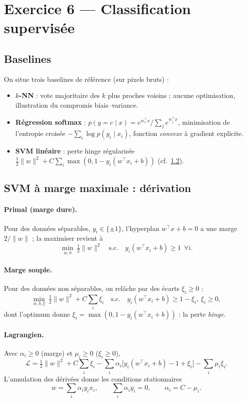 \documentclass[11pt]{article}
\theoremstyle{remark}
\newcommand{\norm}[1]{\lVert #1 \rVert}
\newcommand{\T}{^{\top}}
\begin{document}
\section{Exercice 6 — Classification supervisée}

\subsection{Baselines}
On situe trois baselines de référence (sur pixels bruts) :
\begin{itemize}\itemsep2pt
	\item \textbf{$k$-NN} : vote majoritaire des $k$ plus proches voisins ; aucune
	optimisation, illustration du compromis biais–variance.
	\item \textbf{Régression softmax} : $p(y=c\mid x)=e^{w_c\T x}/\sum_j e^{w_j\T x}$,
	minimisation de l'entropie croisée $-\sum_i\log p(y_i\mid x_i)$, fonction
	\emph{convexe} à gradient explicite.
	\item \textbf{SVM linéaire} : perte hinge régularisée
	$\tfrac12\norm{w}^2+C\sum_i\max(0,1-y_i(w\T x_i+b))$ (cf.~\ref{sec:svm}).
\end{itemize}

\subsection{SVM à marge maximale : dérivation}\label{sec:svm}
\paragraph{Primal (marge dure).} Pour des données séparables, $y_i\in\{\pm1\}$,
l'hyperplan $w\T x+b=0$ a une marge $2/\norm{w}$ ; la maximiser revient à
\begin{equation}
	\min_{w,b}\ \tfrac12\norm{w}^2
	\quad\text{s.c.}\quad y_i(w\T x_i+b)\ge 1 \ \ \forall i .
\end{equation}
\paragraph{Marge souple.} Pour des données non séparables, on relâche par des
écarts $\xi_i\ge0$ :
\begin{equation}
	\min_{w,b,\xi}\ \tfrac12\norm{w}^2 + C\sum_i\xi_i
	\quad\text{s.c.}\quad y_i(w\T x_i+b)\ge 1-\xi_i,\ \xi_i\ge0 ,
\end{equation}
dont l'optimum donne $\xi_i=\max(0,1-y_i(w\T x_i+b))$ : la perte \emph{hinge}.
\paragraph{Lagrangien.} Avec $\alpha_i\ge0$ (marge) et $\mu_i\ge0$ ($\xi_i\ge0$),
\[
\mathcal L=\tfrac12\norm{w}^2+C\sum_i\xi_i
-\sum_i\alpha_i\big[y_i(w\T x_i+b)-1+\xi_i\big]-\sum_i\mu_i\xi_i .
\]
L'annulation des dérivées donne les conditions stationnaires
\begin{equation}
	w=\sum_i\alpha_i y_i x_i,\qquad
	\sum_i\alpha_i y_i=0,\qquad
	\alpha_i = C-\mu_i .
\end{equation}
\end{document}
